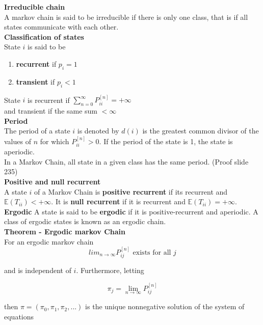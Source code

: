 \textbf{Irreducible chain}\\
A markov chain is said to be irreducible if there is only one class, that is if all states communicate with each other.\\

\textbf{Classification of states}\\
State $i$ is said to be
\begin{enumerate}
	\item \textbf{recurrent} if $p_i = 1$
	\item \textbf{transient} if $p_i < 1$
\end{enumerate}

State $i$ is recurrent if $\sum_{n=0}^\infty P_{ii}^[n] = + \infty$\\
and transient if the same sum $< \infty$\\

\textbf{Period}\\
The period of a state $i$ is denoted by $d(i)$ is the greatest common divisor of the values of $n$ for which $P_{ii}^{[n]} > 0$. If the period of the state is 1, the state is aperiodic.\\

In a Markov Chain, all state in a given class has the same period. (Proof slide 235)\\

\textbf{Positive and null recurrent}\\
A state $i$ of a Markov Chain is \textbf{positive recurrent} if its recurrent and $\mathbb{E}(T_{ii}) < +\infty$. It is \textbf{null recurrent} if it is recurrent and $\mathbb{E}(T_{ii}) = + \infty$.\\

\textbf{Ergodic}
A state is said to be \textbf{ergodic} if it is positive-recurrent and aperiodic. A class of ergodic states is known as an ergodic chain. \\

\textbf{Theorem - Ergodic markov Chain}\\

For an ergodic markov chain\\

$$lim_{n \rightarrow \infty} P_{ij}^{[n]} \text{ exists for all } j$$

and is independent of $i$. Furthermore, letting

$$\pi_j = \lim_{n \rightarrow \infty} P_{ij}^{[n]}$$

then $\pi = (\pi_0, \pi_1, \pi_2,...)$ is the unique nonnegative solution of the system of equations

